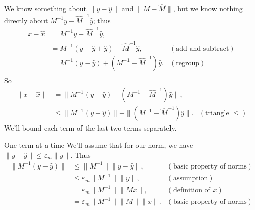 \documentclass[usenames,dvipsnames,fleqn]{beamer}
\theoremstyle{definition}
\begin{document}
\begin{frame}

We know something about \(\| y - \widehat y\| \) and  \( \| M  - \widehat M \| \), but we know nothing directly about
\(M^{-1} y - \widehat M^{-1} \widehat y\); thus
\begin{align*}
   x - \widehat x &= M^{-1} y - \widehat M^{-1} \widehat y, \\
       &=M^{-1} \left(y - \widehat y + \widehat y \right)  - \widehat M^{-1} \widehat y, &(\mbox{add and subtract}) \\
       &= M^{-1} \left(y - \widehat y \right) + \left(M^{-1} - \widehat M^{-1} \right) \widehat y.  &(\mbox{regroup})\\
\end{align*}
So
\begin{align*}
  \|  x - \widehat x \| &= \|M^{-1} \left(y - \widehat y \right) + \left(M^{-1} - \widehat M^{-1} \right) \widehat y \|,\\
       &\leq  \|M^{-1} \left(y - \widehat y \right) \| + \| \left(M^{-1} - \widehat M^{-1} \right) \widehat y \|. &(\mbox{triangle $\leq$})
\end{align*}
We'll bound each term of the last two terms separately.

\end{frame}
\begin{frame}{One term at a time}
We'll assume that for our norm, we have $\| y - \widehat y  \| \leq \varepsilon_m \| y \|$.
Thus
\begin{align*}
   \|M^{-1} \left(y - \widehat y \right) \| &\leq \| M^{-1} \| \| y - \widehat y  \|,  &(\mbox{basic property of norms}) \\
               &\leq  \varepsilon_m \| M^{-1} \| \| y  \|, &(\mbox{assumption}) \\
               &= \varepsilon_m \| M^{-1} \|  \| M x  \|,  &(\mbox{definition of } x ) \\
               &=  \varepsilon_m \| M^{-1} \|  \| M  \| \|x  \|.  &(\mbox{basic property of norms}) 
\end{align*}
\end{frame}
\end{document}
